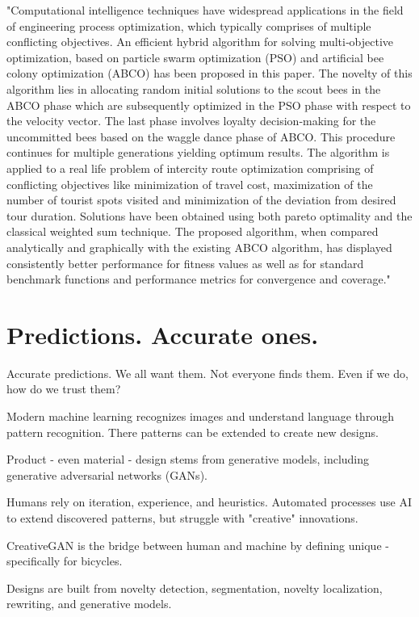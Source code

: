 \documentclass[a4paper,11pt]{article}
\begin{document}
"Computational intelligence techniques have widespread applications in the field of engineering process optimization, which typically comprises of multiple conflicting objectives. An efficient hybrid algorithm for solving multi‐objective optimization, based on particle swarm optimization (PSO) and artificial bee colony optimization (ABCO) has been proposed in this paper. The novelty of this algorithm lies in allocating random initial solutions to the scout bees in the ABCO phase which are subsequently optimized in the PSO phase with respect to the velocity vector. The last phase involves loyalty decision‐making for the uncommitted bees based on the waggle dance phase of ABCO. This procedure continues for multiple generations yielding optimum results. The algorithm is applied to a real life problem of intercity route optimization comprising of conflicting objectives like minimization of travel cost, maximization of the number of tourist spots visited and minimization of the deviation from desired tour duration. Solutions have been obtained using both pareto optimality and the classical weighted sum technique. The proposed algorithm, when compared analytically and graphically with the existing ABCO algorithm, has displayed consistently better performance for fitness values as well as for standard benchmark functions and performance metrics for convergence and coverage."\cite{beed2020hybrid}

\section{Predictions. Accurate ones.}

Accurate predictions. We all want them. Not everyone finds them. Even if we do, how do we trust them? 

Modern machine learning recognizes images and understand language through pattern recognition. There patterns can be extended to create new designs. 

Product - even material - design stems from generative models, including generative adversarial networks (GANs).

Humans rely on iteration, experience, and heuristics. Automated processes use AI to extend discovered patterns, but struggle with "creative" innovations. 

 CreativeGAN is the bridge between human and machine by defining unique - specifically for bicycles.

Designs are built from novelty detection, segmentation, novelty localization, rewriting, and generative models. \cite{nobari2021creativegan}
\end{document}
